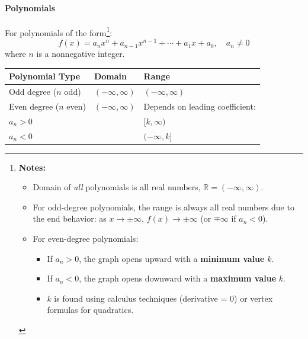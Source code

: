 \documentclass[../main-notes.tex]{subfile}
\begin{document}
\paragraph{Polynomials} For polynomials of the form\footnote{
\textbf{Notes:}
\begin{itemize}
    \item Domain of \textit{all} polynomials is all real numbers, \(\mathbb{R} = (-\infty, \infty)\).
    \item For odd-degree polynomials, the range is always all real numbers due to the end behavior: as \(x \to \pm\infty\), \(f(x) \to \pm\infty\) (or \(\mp\infty\) if \(a_n < 0\)).
    \item For even-degree polynomials:
    \begin{itemize}
        \item If \(a_n > 0\), the graph opens upward with a \textbf{minimum value} \(k\).
        \item If \(a_n < 0\), the graph opens downward with a \textbf{maximum value} \(k\).
        \item \(k\) is found using calculus techniques (derivative = 0) or vertex formulas for quadratics.
    \end{itemize}
\end{itemize}
}:
\[
f(x) = a_n x^n + a_{n-1} x^{n-1} + \cdots + a_1 x + a_0, \quad a_n \neq 0
\]
where \( n \) is a nonnegative integer.

\begin{table}[h]
\centering
\renewcommand{\arraystretch}{1.5}
\begin{tabular}{@{}lll@{}}
\toprule
\textbf{Polynomial Type} & \textbf{Domain} & \textbf{Range} \\ 
\midrule
Odd degree (\(n\) odd) & \( (-\infty, \infty) \) & \( (-\infty, \infty) \) \\
Even degree (\(n\) even) & \( (-\infty, \infty) \) & Depends on leading coefficient: \\
\quad \(a_n > 0\) & & \( [k, \infty) \) \\
\quad \(a_n < 0\) & & \( (-\infty, k] \) \\
\bottomrule
\end{tabular}
\end{table}
\end{document}
